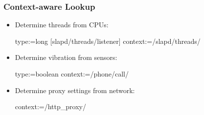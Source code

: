 \begin{frame}[fragile]
	\frametitle{Context-aware Lookup}

	\begin{itemize}
	\item
	Determine threads from CPUs:

	\begin{code}
	  type:=long
	[slapd/threads/listener]
	  context:=/slapd/threads/%
	\end{code}

	\item
	Determine vibration from sensors:

	\begin{code}
	  type:=boolean
	  context:=/phone/call/%
	\end{code}

	\item
	Determine proxy settings from network:

	\begin{code}
	  context:=/http_proxy/%
	\end{code}
	\end{itemize}
\end{frame}







\nocite{raab2017introducing}

\appendix

\begin{frame}[allowframebreaks]
	
	
\end{frame}





